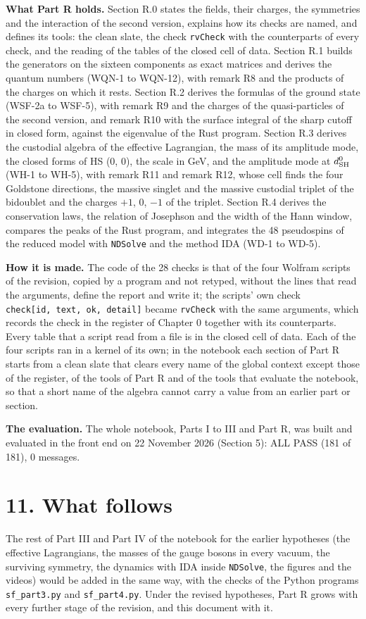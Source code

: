 \documentclass[
  10pt,
]{article}
\begin{document}
\textbf{What Part R holds.} Section R.0 states the fields, their
charges, the symmetries and the interaction of the second version,
explains how its checks are named, and defines its tools: the clean
slate, the check \texttt{rvCheck} with the counterparts of every check,
and the reading of the tables of the closed cell of data. Section R.1
builds the generators on the sixteen components as exact matrices and
derives the quantum numbers (WQN-1 to WQN-12), with remark R8 and the
products of the charges on which it rests. Section R.2 derives the
formulas of the ground state (WSF-2a to WSF-5), with remark R9 and the
charges of the quasi-particles of the second version, and remark R10
with the surface integral of the sharp cutoff in closed form, against
the eigenvalue of the Rust program. Section R.3 derives the custodial
algebra of the effective Lagrangian, the mass of its amplitude mode, the
closed forms of HS (0, 0), the scale in GeV, and the amplitude mode at
\(d^0_{\rm SH}\) (WH-1 to WH-5), with remark R11 and remark R12, whose
cell finds the four Goldstone directions, the massive singlet and the
massive custodial triplet of the bidoublet and the charges \(+1\), 0,
\(-1\) of the triplet. Section R.4 derives the conservation laws, the
relation of Josephson and the width of the Hann window, compares the
peaks of the Rust program, and integrates the 48 pseudospins of the
reduced model with \texttt{NDSolve} and the method IDA (WD-1 to WD-5).

\textbf{How it is made.} The code of the 28 checks is that of the four
Wolfram scripts of the revision, copied by a program and not retyped,
without the lines that read the arguments, define the report and write
it; the scripts' own check \texttt{check{[}id,\ text,\ ok,\ detail{]}}
became \texttt{rvCheck} with the same arguments, which records the check
in the register of Chapter 0 together with its counterparts. Every table
that a script read from a file is in the closed cell of data. Each of
the four scripts ran in a kernel of its own; in the notebook each
section of Part R starts from a clean slate that clears every name of
the global context except those of the register, of the tools of Part R
and of the tools that evaluate the notebook, so that a short name of the
algebra cannot carry a value from an earlier part or section.

\textbf{The evaluation.} The whole notebook, Parts I to III and Part R,
was built and evaluated in the front end on 22 November 2026 (Section
5): ALL PASS (181 of 181), 0 messages.

\hypertarget{what-follows}{%
\section{11. What follows}\label{what-follows}}

The rest of Part III and Part IV of the notebook for the earlier
hypotheses (the effective Lagrangians, the masses of the gauge bosons in
every vacuum, the surviving symmetry, the dynamics with IDA inside
\texttt{NDSolve}, the figures and the videos) would be added in the same
way, with the checks of the Python programs \texttt{sf\_part3.py} and
\texttt{sf\_part4.py}. Under the revised hypotheses, Part R grows with
every further stage of the revision, and this document with it.
\end{document}
